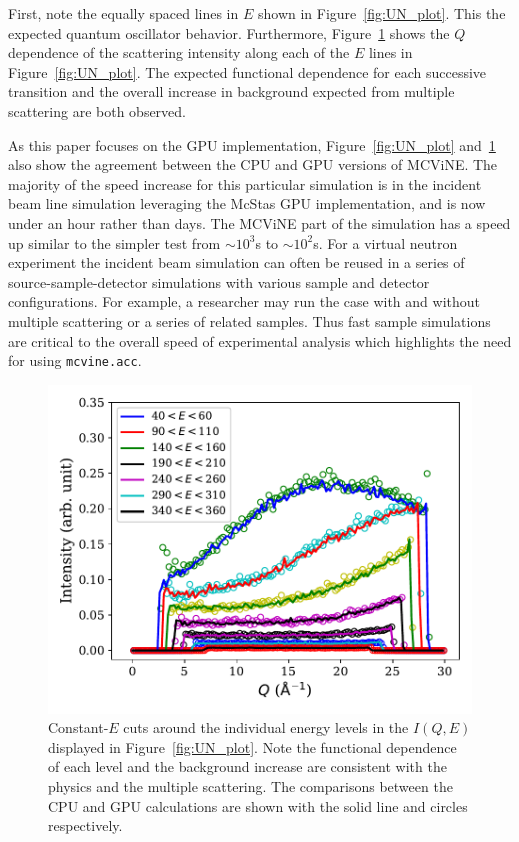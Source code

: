 First, note the equally spaced lines in $E$ shown in Figure~\ref{fig:UN_plot}. This the expected quantum oscillator behavior.
Furthermore, Figure~\ref{fig:UN_cuts} shows the $Q$ dependence of the scattering intensity along each of the $E$ lines in Figure~\ref{fig:UN_plot}.
The expected functional dependence for each successive transition and the overall increase in background expected from multiple scattering are both observed.

As this paper focuses on the GPU implementation, Figure~\ref{fig:UN_plot} and~\ref{fig:UN_cuts} also show the agreement between the CPU and GPU versions of MCViNE.
The majority of the speed increase for this particular simulation is in the incident beam line simulation leveraging the McStas GPU implementation, and is now under an hour rather than days.
The MCViNE part of the simulation has a speed up similar to the simpler test from $\sim 10^3$s to $\sim 10^2$s.
For a virtual neutron experiment the incident beam simulation can often be reused in a series of source-sample-detector simulations with various sample and detector configurations.
For example, a researcher may run the case with and without multiple scattering or a series of related samples. Thus fast sample simulations are critical to the overall speed of experimental analysis which highlights the need for using \texttt{mcvine.acc}.



\begin{figure}[h]
\centering
\includegraphics[width=\columnwidth]{figures/Constant_E_cuts_high_contrast.pdf}
\caption{Constant-$E$ cuts around the individual energy levels
in the $I(Q, E)$ displayed in
Figure~\ref{fig:UN_plot}. Note the functional dependence of each level and the background increase are consistent with the physics and the multiple scattering. The comparisons between the CPU and GPU calculations are shown with the solid line and circles respectively.
}
\label{fig:UN_cuts}
\end{figure}

